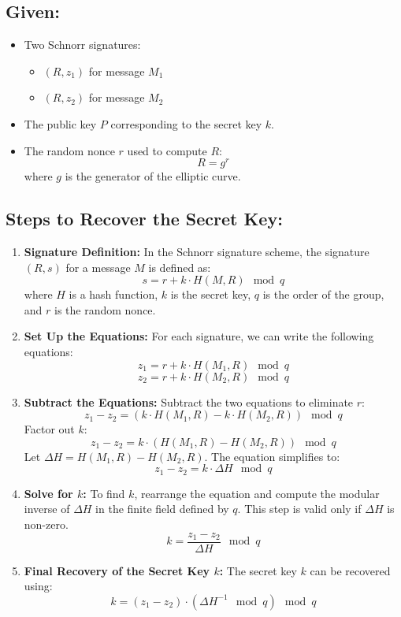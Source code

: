 \documentclass[12pt]{article}
\begin{document}
\subsection{Given:}
\begin{itemize}
    \item Two Schnorr signatures:
    \begin{itemize}
        \item \((R, z_1)\) for message \(M_1\)
        \item \((R, z_2)\) for message \(M_2\)
    \end{itemize}
    \item The public key \(P\) corresponding to the secret key \(k\).
    \item The random nonce \(r\) used to compute \(R\):
    \[
    R = g^r
    \]
    where \(g\) is the generator of the elliptic curve.
\end{itemize}

\subsection{Steps to Recover the Secret Key:}

\begin{enumerate}
    \item \textbf{Signature Definition:} In the Schnorr signature scheme, the signature \((R, s)\) for a message \(M\) is defined as:
    \[
    s = r + k \cdot H(M, R) \mod q
    \]
    where \(H\) is a hash function, \(k\) is the secret key, \(q\) is the order of the group, and \(r\) is the random nonce.

    \item \textbf{Set Up the Equations:} For each signature, we can write the following equations:
    \[
    z_1 = r + k \cdot H(M_1, R) \mod q
    \]
    \[
    z_2 = r + k \cdot H(M_2, R) \mod q
    \]

    \item \textbf{Subtract the Equations:} Subtract the two equations to eliminate \(r\):
    \[
    z_1 - z_2 = (k \cdot H(M_1, R) - k \cdot H(M_2, R)) \mod q
    \]
    Factor out \(k\):
    \[
    z_1 - z_2 = k \cdot (H(M_1, R) - H(M_2, R)) \mod q
    \]
    Let \(\Delta H = H(M_1, R) - H(M_2, R)\). The equation simplifies to:
    \[
    z_1 - z_2 = k \cdot \Delta H \mod q
    \]

    \item \textbf{Solve for \(k\):} To find \(k\), rearrange the equation and compute the modular inverse of \(\Delta H\) in the finite field defined by \(q\). This step is valid only if \(\Delta H\) is non-zero.
    \[
    k = \frac{z_1 - z_2}{\Delta H} \mod q
    \]

    \item \textbf{Final Recovery of the Secret Key \(k\):} The secret key \(k\) can be recovered using:
    \[
    k = (z_1 - z_2) \cdot (\Delta H^{-1} \mod q) \mod q
    \]
\end{enumerate}
\end{document}

